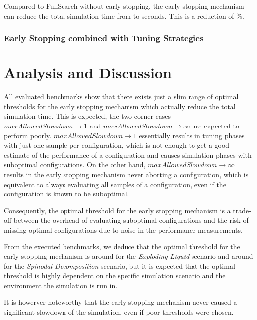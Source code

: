 \documentclass[conference]{IEEEtran}
\begin{document}



Compared to FullSearch without early stopping, the early stopping mechanism can reduce the total simulation time from  to  seconds. This is a reduction of \%.


\subsubsection{Early Stopping combined with Tuning Strategies}



\section{Analysis and Discussion}

All evaluated benchmarks show that there exists just a slim range of optimal thresholds for the early stopping mechanism which actually reduce the total simulation time. This is expected, the two corner cases $maxAllowedSlowdown \to 1$ and $maxAllowedSlowdown \to \infty$ are expected to perform poorly. $maxAllowedSlowdown \to 1$ essentially results in tuning phases with just one sample per configuration, which is not enough to get a good estimate of the performance of a configuration and causes simulation phases with suboptimal configurations. On the other hand, $maxAllowedSlowdown \to \infty$ results in the early stopping mechanism never aborting a configuration, which is equivalent to always evaluating all samples of a configuration, even if the configuration is known to be suboptimal.

Consequently, the optimal threshold for the early stopping mechanism is a trade-off between the overhead of evaluating suboptimal configurations and the risk of missing optimal configurations due to noise in the performance measurements.

From the executed benchmarks, we deduce that the optimal threshold for the early stopping mechanism is around  for the \textit{Exploding Liquid} scenario and around  for the \textit{Spinodal Decomposition} scenario, but it is expected that the optimal threshold is highly dependent on the specific simulation scenario and the environment the simulation is run in.

It is howerver noteworthy that the early stopping mechanism never caused a significant slowdown of the simulation, even if poor thresholds were chosen.
\end{document}
